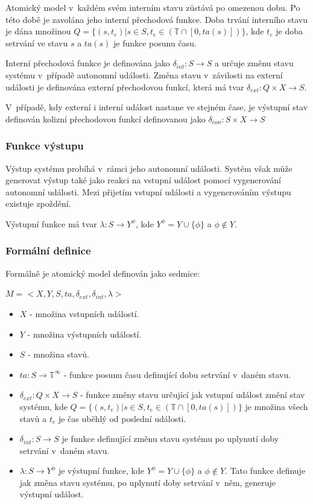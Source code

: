 Atomický model v~každém svém interním stavu zůstává po omezenou dobu. Po této době je zavolána jeho interní přechodová funkce. Doba trvání interního stavu je dána množinou $Q=\{(s,t_e)|s \in S, t_e \in (\mathbb{T} \cap [0, ta(s)])\}$, kde $t_e$ je doba setrvání ve stavu $s$ a $ta(s)$ je funkce posunu času.

Interní přechodová funkce je definována jako $\delta_{int}:S \rightarrow S$ a určuje změnu stavu systému v~případě autonomní události. Změna stavu v~závilosti na externí události je definována externí přechodovou funkcí, která má tvar $\delta_{ext}:Q \times X \rightarrow  S$.

V~případě, kdy externí i interní událost nastane ve stejném čase, je výstupní stav definován kolizní přechodovou funkcí definovanou jako $\delta_{con}:S \times X \rightarrow  S$

\subsubsection{Funkce výstupu}

Výstup systému probíhá v~rámci jeho autonomní události. Systém však může generovat výstup také jako reakci na vstupní událost pomocí vygenerování autonomní události. Mezi přijetím vstupní události a vygenerováním výstupu existuje zpoždění.

Výstupní funkce má tvar $\lambda:S \rightarrow  Y^\phi$, kde $Y^\phi=Y \cup \{\phi\}$ a $\phi \not\in Y$.

\subsubsection{Formální definice}

Formálně je atomický model definován jako sedmice:

\begin{math}
M=<X,Y,S,ta, \delta_{ext}, \delta_{int}, \lambda>
\end{math}

\begin{itemize}
\item $X$ - množina vstupních událostí.
\item $Y$ - množina výstupních událostí.
\item $S$ - množina stavů.
\item $ta:S \rightarrow \mathbb{T}^\infty$ - funkce posunu času definující dobu setrvání v~daném stavu.
\item $\delta_{ext}:Q \times X \rightarrow  S$ - funkce změny stavu určující jak vstupní událost změní stav systému, kde $Q=\{(s,t_e)|s \in S, t_e \in (\mathbb{T} \cap [0, ta(s)])\}$ je množina všech stavů a $t_e$ je čas uběhlý od poslední události.
\item $\delta_{int}:S \rightarrow S$ je funkce definující změnu stavu systému po uplynutí doby setrvání v~daném stavu.
\item $\lambda:S \rightarrow  Y^\phi$ je výstupní funkce, kde $Y^\phi=Y \cup \{\phi\}$ a $\phi \not\in Y$. Tato funkce definuje jak změna stavu systému, po uplynutí doby setrvání v~něm, generuje výstupní událost.
\end{itemize}

